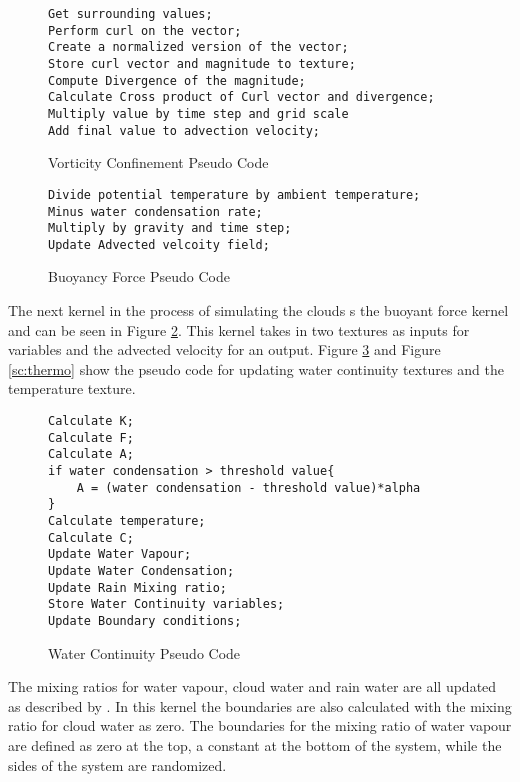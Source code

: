 \begin{figure}[h|]
\centering
\begin{lstlisting}
Get surrounding values;
Perform curl on the vector;
Create a normalized version of the vector;
Store curl vector and magnitude to texture; 
Compute Divergence of the magnitude;
Calculate Cross product of Curl vector and divergence;
Multiply value by time step and grid scale
Add final value to advection velocity;
\end{lstlisting}
\caption{Vorticity Confinement Pseudo Code}
\label{sc:vorticity confinement_one}
\end{figure}

\begin{figure}[h|]
\centering
\begin{lstlisting}
Divide potential temperature by ambient temperature;
Minus water condensation rate;
Multiply by gravity and time step;
Update Advected velcoity field;
\end{lstlisting}
\caption{Buoyancy Force Pseudo Code}
\label{sc:buoyant force}
\end{figure}

The next kernel in the process of simulating the clouds s the buoyant force kernel and can be seen in Figure \ref{sc:buoyant force}.
This kernel takes in two textures as inputs for variables and the advected velocity for an output.
Figure \ref{sc:water} and Figure \ref{sc:thermo} show the pseudo code for updating water continuity textures and the temperature texture. 

\begin{figure}[h|]
\centering
\begin{lstlisting}
Calculate K;
Calculate F;
Calculate A;
if water condensation > threshold value{
	A = (water condensation - threshold value)*alpha
}
Calculate temperature;
Calculate C;
Update Water Vapour;
Update Water Condensation;
Update Rain Mixing ratio;
Store Water Continuity variables;
Update Boundary conditions;
\end{lstlisting}
\caption{Water Continuity Pseudo Code}
\label{sc:water}
\end{figure}

The mixing ratios for water vapour, cloud water and rain water are all updated as described by \cite{houze1994cloud}.
In this kernel the boundaries are also calculated with the mixing ratio for cloud water as zero.
The boundaries for the mixing ratio of water vapour are defined as zero at the top, a constant at the bottom of the system, while the sides of the system are randomized.

